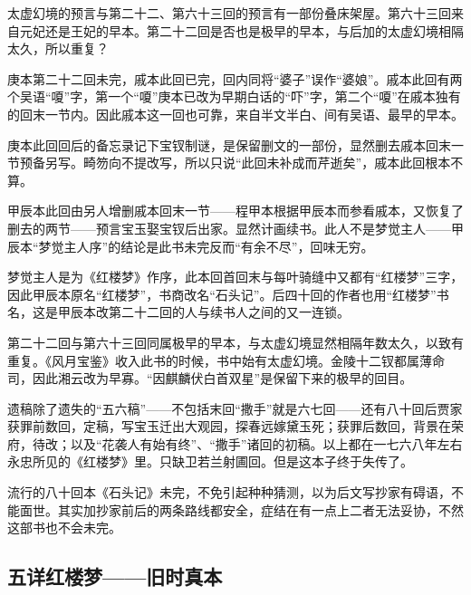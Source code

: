 \par 太虚幻境的预言与第二十二、第六十三回的预言有一部份叠床架屋。第六十三回来自元妃还是王妃的早本。第二十二回是否也是极早的早本，与后加的太虚幻境相隔太久，所以重复？
\par 庚本第二十二回未完，戚本此回已完，回内同将“婆子”误作“婆娘”。戚本此回有两个吴语“嗄”字，第一个“嗄”庚本已改为早期白话的“吓”字，第二个“嗄”在戚本独有的回末一节内。因此戚本这一回也可靠，来自半文半白、间有吴语、最早的早本。
\par 庚本此回回后的备忘录记下宝钗制谜，是保留删文的一部份，显然删去戚本回末一节预备另写。畸笏向不提改写，所以只说“此回未补成而芹逝矣”，戚本此回根本不算。
\par 甲辰本此回由另人增删戚本回末一节——程甲本根据甲辰本而参看戚本，又恢复了删去的两节——预言宝玉娶宝钗后出家。显然计画续书。此人不是梦觉主人——甲辰本“梦觉主人序”的结论是此书未完反而“有余不尽”，回味无穷。
\par 梦觉主人是为《红楼梦》作序，此本回首回末与每叶骑缝中又都有“红楼梦”三字，因此甲辰本原名“红楼梦”，书商改名“石头记”。后四十回的作者也用“红楼梦”书名，这是甲辰本改第二十二回的人与续书人之间的又一连锁。
\par 第二十二回与第六十三回同属极早的早本，与太虚幻境显然相隔年数太久，以致有重复。《风月宝鉴》收入此书的时候，书中始有太虚幻境。金陵十二钗都属薄命司，因此湘云改为早寡。“因麒麟伏白首双星”是保留下来的极早的回目。
\par 遗稿除了遗失的“五六稿”——不包括末回“撒手”就是六七回——还有八十回后贾家获罪前数回，定稿，写宝玉迁出大观园，探春远嫁黛玉死；获罪后数回，背景在荣府，待改；以及“花袭人有始有终”、“撒手”诸回的初稿。以上都在一七六八年左右永忠所见的《红楼梦》里。只缺卫若兰射圃回。但是这本子终于失传了。
\par 流行的八十回本《石头记》未完，不免引起种种猜测，以为后文写抄家有碍语，不能面世。其实加抄家前后的两条路线都安全，症结在有一点上二者无法妥协，不然这部书也不会未完。



\subsection{五详红楼梦——旧时真本}

